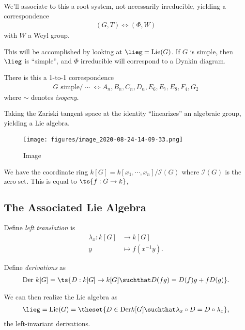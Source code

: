 We'll associate to this a root system, not necessarily irreducible,
yielding a correspondence
\begin{align*}  
(G, T) \iff (\Phi, W)
\end{align*} with \(W\) a Weyl group.

This will be accomplished by looking at \(\lieg = \mathrm{Lie}(G)\). If
\(G\) is simple, then \(\lieg\) is ``simple'', and \(\Phi\) irreducible
will correspond to a Dynkin diagram.

There is this a 1-to-1 correspondence
\begin{align*}  
G \text{ simple}/\sim \iff A_n, B_n, C_n, D_n, E_6, E_7, E_8, F_4, G_2
\end{align*} where \(\sim\) denotes \emph{isogeny}.

Taking the Zariski tangent space at the identity ``linearizes'' an
algebraic group, yielding a Lie algebra.

\begin{figure}
\centering
\texttt{[image: figures/image\_2020-08-24-14-09-33.png]}
\caption{Image}
\end{figure}

We have the coordinate ring
\(k[G] = k[x_1, \cdots, x_n] / \mathcal{I}(G)\) where \(\mathcal{I}(G)\)
is the zero set. This is equal to \(\ts{f:G\to k}\),

\hypertarget{the-associated-lie-algebra}{%
\subsection{The Associated Lie
Algebra}\label{the-associated-lie-algebra}}

\begin{definition}

Define \emph{left translation} is
\begin{align*}  
\lambda_x: k[G] &\to k[G] \\
y &\mapsto f(x^{-1} y)
.\end{align*}

Define \emph{derivations} as
\begin{align*}  
\mathrm{Der} ~k[G] = \ts{D: k[G] \to k[G] \suchthat D(fg) = D(f) g + f D(g) }
.\end{align*}

We can then realize the Lie algebra as
\begin{align*}  
\lieg = \mathrm{Lie}(G) = \theset{D\in \mathrm{Der} k[G] \suchthat \lambda_x \circ D = D\circ \lambda_x}
,\end{align*} the left-invariant derivations.

\end{definition}

